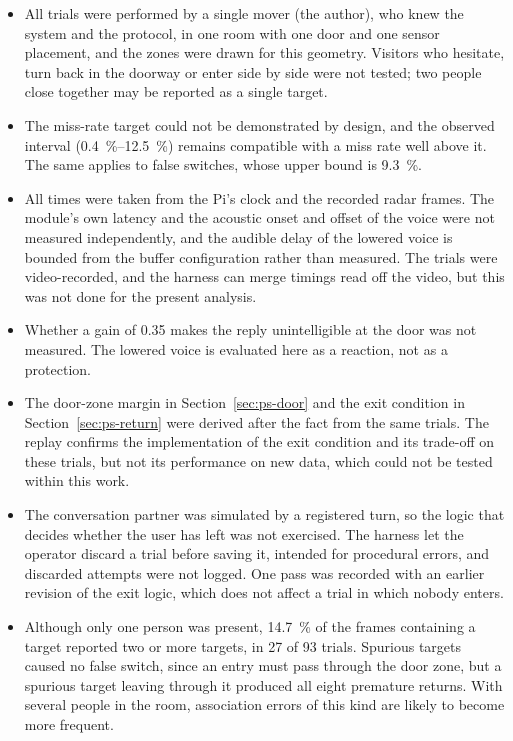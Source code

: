 \begin{itemize}
  \item All trials were performed by a single mover (the author), who knew the
  system and the protocol, in one room with one door and one sensor placement,
  and the zones were drawn for this geometry. Visitors who hesitate, turn back
  in the doorway or enter side by side were not tested; two people close
  together may be reported as a single target.

  \item The miss-rate target could not be demonstrated by design, and the
  observed interval (\SIrange{0.4}{12.5}{\percent}) remains compatible with a
  miss rate well above it. The same applies to false switches, whose upper
  bound is \SI{9.3}{\percent}.

  \item All times were taken from the Pi's clock and the recorded radar frames.
  The module's own latency and the acoustic onset and offset of the voice were
  not measured independently, and the audible delay of the lowered voice is
  bounded from the buffer configuration rather than measured. The trials were
  video-recorded, and the harness can merge timings read off the video, but
  this was not done for the present analysis.

  \item Whether a gain of 0.35 makes the reply unintelligible at the door was
  not measured. The lowered voice is evaluated here as a reaction, not as a
  protection.

  \item The door-zone margin in Section~\ref{sec:ps-door} and the exit
  condition in Section~\ref{sec:ps-return} were derived after the fact from the
  same trials. The replay confirms the implementation of the exit condition and
  its trade-off on these trials, but not its performance on new data, which
  could not be tested within this work.

  \item The conversation partner was simulated by a registered turn, so the
  logic that decides whether the user has left was not exercised. The harness
  let the operator discard a trial before saving it, intended for procedural
  errors, and discarded attempts were not logged. One pass was recorded with
  an earlier revision of the exit logic, which does not affect a trial in which
  nobody enters.

  \item Although only one person was present, \SI{14.7}{\percent} of the
  frames containing a target reported two or more targets, in 27 of 93 trials.
  Spurious targets caused no false switch, since an entry must pass through
  the door zone, but a spurious target leaving through it produced all eight
  premature returns. With several people in the room, association errors of
  this kind are likely to become more frequent.
\end{itemize}
